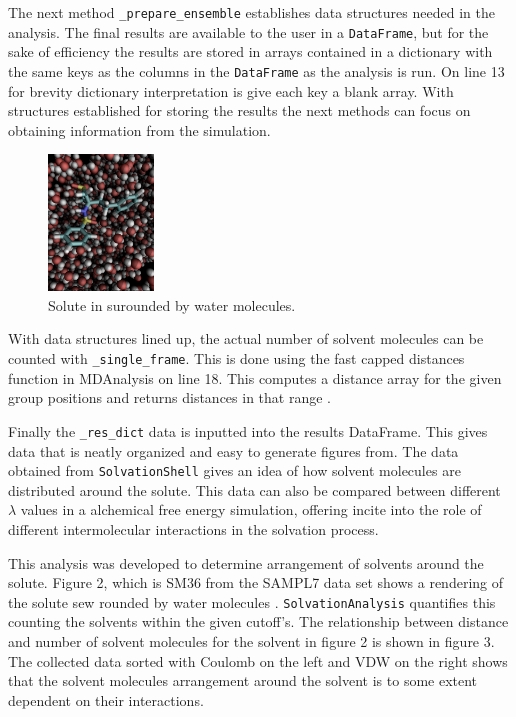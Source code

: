 \documentclass{article}[letterpaper, margins=1in, 12pt]
\begin{document}
The next method \lstinline{_prepare_ensemble} establishes data structures needed in the analysis. The final results are available to the user in a \texttt{DataFrame}, but for the sake of efficiency the results are stored in arrays contained in a dictionary with the same keys as the columns in the \texttt{DataFrame} as the analysis is run. On line 13 for brevity dictionary interpretation is give each key a blank array.  With structures established for storing the results the next methods can focus on obtaining information from the simulation.

\begin{figure}
	\centering
	\includegraphics[width=0.25\textwidth]{solvent}
	\caption{Solute in surounded by water molecules.}
	\label{fig:solute}
\end{figure}

With data structures lined up, the actual number of solvent molecules can be counted with \lstinline{_single_frame}. This is done using the fast capped distances function in MDAnalysis on line 18. This computes a distance array for the given group positions and returns distances in that range \cite{michaud-agrawal_mdanalysis_2011, gowers_mdanalysis_2016}.

Finally the \lstinline{_res_dict} data is inputted into the results DataFrame. This gives data that is neatly organized and easy to generate figures from. The data obtained from \texttt{SolvationShell} gives an idea of how solvent molecules are distributed around the solute. This data can also be compared between different $\lambda$ values in a alchemical free energy simulation, offering incite into the role of different intermolecular interactions in the solvation process.

This analysis was developed to determine arrangement of solvents around the solute. Figure 2, which is SM36 from the SAMPL7 data set shows a rendering of the solute sew rounded by water molecules \cite{fan_precise_2021}. \texttt{SolvationAnalysis} quantifies this counting the solvents within the given cutoff's. The relationship between distance and number of solvent molecules for the solvent in figure 2 is shown in figure 3. The collected data sorted with Coulomb on the left and VDW on the right shows that the solvent molecules arrangement around the solvent is to some extent dependent on their interactions.
\end{document}
